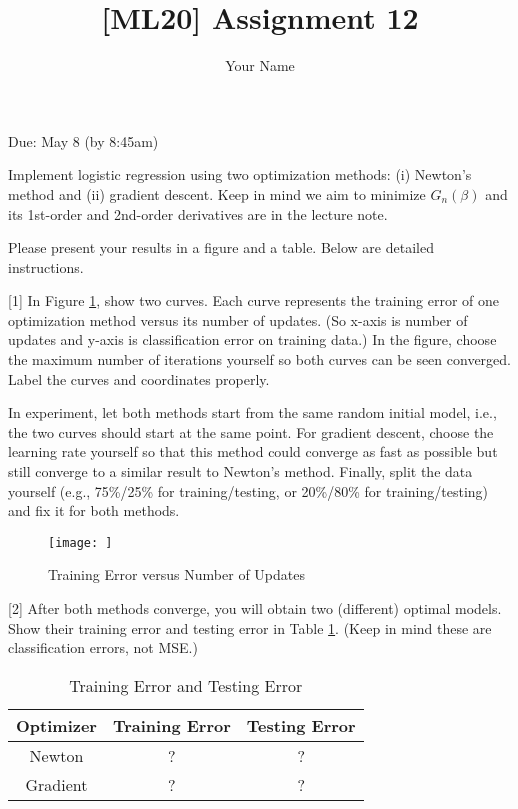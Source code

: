 \documentclass{llncs}
\title{[ML20] Assignment 12}
\author{Your Name}
\institute{}
\begin{document}
\maketitle 

\setlength\parindent{0pt} 
\setlength{\parskip}{10pt}

Due: May 8 (by 8:45am) 

Implement logistic regression using 
two optimization methods: 
(i) Newton's method and 
(ii) gradient descent. 
Keep in mind we aim to minimize 
$G_{n}(\beta)$ and its 1st-order
and 2nd-order derivatives are in 
the lecture note. 

Please present your results in 
a figure and a table. Below are 
detailed instructions. 

[1] In Figure \ref{hw12_fig1}, 
show two curves. 
Each curve represents the 
training error of one optimization 
method versus its number of updates. 
(So x-axis is number of updates 
and y-axis is classification error 
on training data.) In the figure, 
choose the maximum
number of iterations 
yourself so both curves can be seen
converged. Label the curves and 
coordinates properly. 

In experiment, let both methods 
start from the same random initial model, i.e., the two curves should
start at the same point. 
For gradient descent, choose the 
learning rate yourself so that 
this method could converge as fast 
as possible but still converge 
to a similar result to Newton's method. 
Finally, split the data yourself 
(e.g., 75\%/25\% for training/testing, 
or 20\%/80\% for training/testing) 
and fix it for both methods. 

\begin{figure}[h!] 
\centering 
\texttt{[image: ]} 
\caption{Training Error versus 
Number of Updates} 
\label{hw12_fig1}
\end{figure}

\newpage 

[2] After both methods converge, 
you will obtain two (different) 
optimal models. 
Show their training error and 
testing error in 
Table \ref{hw12_tab1}. 
(Keep in mind these are 
classification errors, not MSE.) 

\begin{table}
\caption{Training Error and 
Testing Error}
\centering
\setlength{\tabcolsep}{10pt} %
\def\arraystretch{2} %
\begin{tabular}{c|c|c} \hline 
Optimizer & Training Error & Testing Error \\ \hline 
Newton & ? & ?\\ \hline
Gradient & ? & ?\\ \hline 
\end{tabular}
\label{hw12_tab1}
\end{table}
\end{document}
